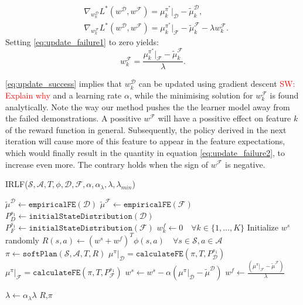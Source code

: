 \documentclass[letterpaper]{article}
\newcommand{\sw}[1]{\textcolor{red}{SW: #1}}
\newcommand{\ks}[1]{\textcolor{green}{Kyriacos: #1}}
\newcommand{\sw}[1]{}
\newcommand{\ks}[1]{}
\begin{document}
\begin{align}
	&\nabla_{w^{\mathcal{D}}_k}L^*(w^{\mathcal{D}},w^{\mathcal{F}}) = \mu^{\pi^*}_ k|_{\mathcal{D}}- \widetilde{\mu}^{\mathcal{D}}_k \label{eq:update_success},\\
		&\nabla_{w^{\mathcal{F}}_k}L^*(w^{\mathcal{D}},w^{\mathcal{F}}) = \mu^{\pi^*}_k|_{\mathcal{F}} - \widetilde{\mu}^{\mathcal{F}}_k - \lambda w^{\mathcal{F}}_k. \label{eq:update_failure1}
\end{align}
Setting \eqref{eq:update_failure1} to zero yields:
\begin{equation}
  \label{eq:update_failure2}
  w^{\mathcal{F}}_k = \frac{\mu^{\pi^*}_k|_{\mathcal{F}} - \widetilde{\mu}^{\mathcal{F}}_k}{\lambda}.
\end{equation}
%

\eqref{eq:update_success} implies that $w^{\mathcal{D}}_k$ can be updated using gradient descent \sw{Explain why} and a learning rate $\alpha$, %
while the minimising solution for $w^{\mathcal{F}}_k$ is found analytically. Note the way our method pushes the the learner model away from the failed demonstrations. A possitive $w^{\mathcal{F}}$ will have a possitive effect on feature $k$ of the reward function in general. Subsequently, the policy derived in the next iteration will cause more of this feature to appear in the feature expectations, which would finally result in the quantity in equation \eqref{eq:update_failure2}, to increase even more. The contrary holds when the sign of $w^{\mathcal{F}}$ is negative. 
\begin{algorithm}
\caption{IRLF($\mathcal{S},\mathcal{A},T, \phi, \mathcal{D}, \mathcal{F}, \alpha, \alpha_{\lambda}, \lambda, \lambda_{min}$) }
\label{alg:lff}
\begin{algorithmic}[1]
\STATE $\widetilde{\mu}^{\mathcal{D}} \gets \mathtt{empiricalFE}(\mathcal{D})$\hfill {}
\STATE $\widetilde{\mu}^{\mathcal{F}} \gets \mathtt{empiricalFE}(\mathcal{F})$ 
\STATE $P_{D}^{s_1} \gets \mathtt{initialStateDistribution}(\mathcal{D})$
\STATE $P_{F}^{s_1} \gets \mathtt{initialStateDistribution}(\mathcal{F})$
\STATE $w^f_k\gets 0\quad\forall k\in\{1,\ldots,K\}$
\STATE Initialize $w^s$ randomly
\REPEAT
\STATE $R(s,a) \gets (w^s+w^f)^T\phi(s,a)\quad\forall s\in\mathcal{S},a\in\mathcal{A}$
\STATE $\pi \gets \mathtt{softPlan}(\mathcal{S},\mathcal{A},T,R)$\hfill{}
\STATE $\mu^\pi|_{\mathcal{D}} = \mathtt{calculateFE}(\pi,T,P_{\mathcal{D}}^{s_1})$
\STATE $\mu^\pi|_{\mathcal{F}} = \mathtt{calculateFE}(\pi,T,P_{\mathcal{F}}^{s_1})$
\STATE $w^s \leftarrow w^s - \alpha (\mu^\pi|_{\mathcal{D}} - \widetilde{\mu}^{\mathcal{D}})$
\STATE $w^f \leftarrow \frac{(\mu^\pi|_{\mathcal{F}} - \widetilde{\mu}^{\mathcal{F}})}{\lambda}$

\STATE $\lambda \leftarrow \alpha_{\lambda}\lambda$
\ENDIF
{}
\RETURN $R$,$\pi$
\end{algorithmic}
\end{algorithm}
\end{document}
